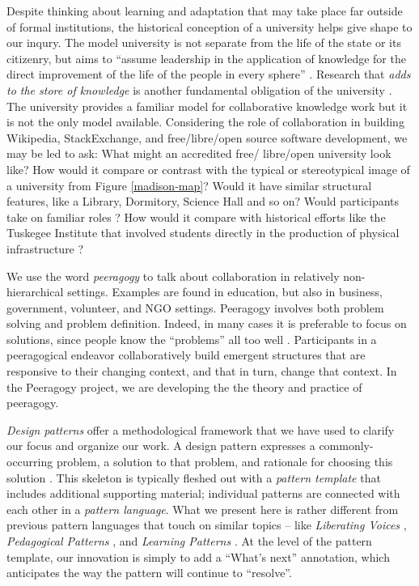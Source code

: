 Despite thinking about learning and adaptation that
may take place far outside of formal institutions, the historical
conception of a university helps give shape to our inqury.
%
The model university is not separate from the life of the state or its
citizenry, but aims to ``assume leadership in the application of
knowledge for the direct improvement of the life of the people in
every sphere'' \cite[p.~88]{curti1949university}. Research that
\emph{adds to the store of knowledge} is another fundamental
obligation of the university \cite[p.~550]{curti1949university}.
The university provides a familiar model for collaborative knowledge work
but it is not the only model available.
Considering the role of collaboration in building Wikipedia,
StackExchange, and free\slash libre\slash open source software
development, we may be led to ask:  What might an accredited free\slash
libre\slash open university look like?  How would it compare or
contrast with the typical or stereotypical image of a university from
Figure \ref{madison-map}?  Would it have similar structural features, like a Library,
Dormitory, Science Hall and so on?  Would participants take
on familiar roles \cite{corneli+crowdsourcing}?  How would it compare
with historical efforts like the Tuskegee Institute that involved
students directly in the production of physical infrastructure
\cite{washington1986up,building-peeragogy-accelerator}?

We use the word \emph{peeragogy} to talk about collaboration in
relatively non-hierarchical settings.  Examples are found in
education, but also in business, government, volunteer, and NGO
settings.  Peeragogy involves both problem solving and problem
definition.  Indeed, in many cases it is preferable to focus on
solutions, since people know the ``problems'' all too well
\cite{ariyaratneXorganizationX1977}.  Participants in a peeragogical
endeavor collaboratively build emergent structures that are responsive
to their changing context, and that in turn, change that context. In
the Peeragogy project, we are developing the the theory and practice
of peeragogy.

\emph{Design patterns} offer a methodological framework that we have
used to clarify our focus and organize our work.  A design pattern
expresses a commonly-occurring problem, a solution to that problem,
and rationale for choosing this solution \cite{meszaros1998pattern}.
This skeleton is typically fleshed out with a \emph{pattern template}
that includes additional supporting material; individual patterns are
connected with each other in a \emph{pattern language}.  What we
present here is rather different from previous pattern languages that touch
on similar topics -- like \emph{Liberating Voices}
\cite{schuler2008liberating}, \emph{Pedagogical Patterns}
\cite{bergin2012pedagogical}, and \emph{Learning Patterns}
\cite{iba2014learning}.  At the level of the pattern template, our
innovation is simply to add a ``What's next'' annotation, which
anticipates the way the pattern will continue to ``resolve''.

